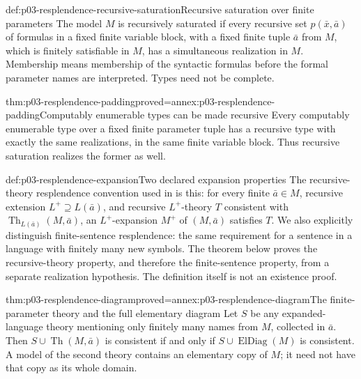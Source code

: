 \begin{hbdefinition}{def:p03-resplendence-recursive-saturation}{Recursive saturation over finite parameters}
The model \(M\) is recursively saturated if every recursive set
\(p(\bar x,\bar a)\) of formulas in a fixed finite variable block,
with a fixed finite tuple \(\bar a\) from \(M\), which is finitely
satisfiable in \(M\), has a simultaneous realization in \(M\).
Membership means membership of the syntactic formulas before the formal
parameter names are interpreted. Types need not be complete.
\end{hbdefinition}

\begin{hblemma}{thm:p03-resplendence-padding}{proved=annex:p03-resplendence-padding}{Computably enumerable types can be made recursive}
Every computably enumerable type over a fixed finite parameter tuple has
a recursive type with exactly the same realizations, in the same finite
variable block. Thus recursive saturation realizes the former as well.
\end{hblemma}

\begin{hbdefinition}{def:p03-resplendence-expansion}{Two declared expansion properties}
The recursive-theory resplendence convention used in
\cite[Definition~1.22]{Engstrom2004Expansions} is this: for every finite
\(\bar a\in M\), recursive extension \(L^+\supseteq L(\bar a)\), and
recursive \(L^+\)-theory \(T\) consistent with
\(\operatorname{Th}_{L(\bar a)}(M,\bar a)\), an \(L^+\)-expansion
\(M^+\) of \((M,\bar a)\) satisfies \(T\).
We also explicitly distinguish finite-sentence resplendence: the same
requirement for a sentence in a language with finitely many new symbols.
The theorem below proves the recursive-theory property, and therefore
the finite-sentence property, from a separate realization hypothesis.
The definition itself is not an existence proof.
\end{hbdefinition}

\begin{hblemma}{thm:p03-resplendence-diagram}{proved=annex:p03-resplendence-diagram}{The finite-parameter theory and the full elementary diagram}
Let \(S\) be any expanded-language theory mentioning only finitely many
names from \(M\), collected in \(\bar a\). Then
\(S\cup\operatorname{Th}(M,\bar a)\) is consistent if and only if
\(S\cup\operatorname{ElDiag}(M)\) is consistent. A model of the second
theory contains an elementary copy of \(M\); it need not have that copy
as its whole domain.
\end{hblemma}

